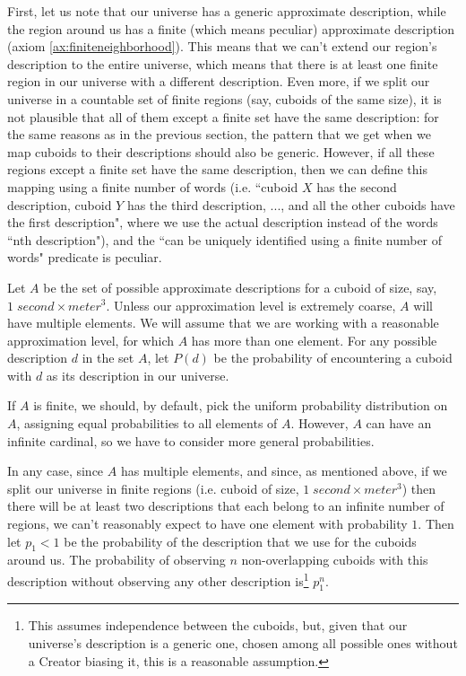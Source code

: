 \documentclass[a4paper
,draft
]{article}
\newcommand{\ghilimele}[1]{``#1"}
\begin{document}
First, let us note that our universe has a generic approximate description,
while the region around us has a finite (which means peculiar) approximate
description (axiom \ref{ax:finiteneighborhood}).
This means that we can't
extend our region's description to the entire universe, which means that
there is at least one finite region in our universe with a different
description.
Even more, if we split our universe in a countable set of finite regions
(say, cuboids of the same size),
it is not plausible that all of them except a finite set have the same
description: for the same reasons as in the previous section,
the pattern that we get when we map cuboids to their descriptions should also
be generic.
However, if all these regions except a finite set have the same
description, then we can define this mapping using a finite number of words
(i.e. \ghilimele{cuboid $X$ has the second description,
cuboid $Y$ has the third description, ..., and all the other cuboids have the
first description}, where we use the actual description instead of the words
\ghilimele{nth description}),
and the \ghilimele{can be uniquely identified using a
finite number of words} predicate is peculiar.

Let $A$ be the set of possible approximate descriptions for
a cuboid of size, say, $1\;second \times meter^3$.
Unless our approximation level is extremely coarse,
$A$ will have multiple elements.
We will assume that we are working with a reasonable approximation level,
for which $A$ has more than one element.
For any possible description $d$ in the set $A$,
let $P(d)$ be the probability of encountering
a cuboid with $d$ as its description in our universe.

If $A$ is finite, we should, by default, pick the uniform probability
distribution on $A$, assigning equal probabilities to all elements of $A$.
However, $A$ can have an infinite cardinal,
so we have to consider more general probabilities.

In any case, since $A$ has multiple elements, and since, as mentioned above,
if we split our universe in finite regions
(i.e. cuboid of size, $1\;second \times meter^3$) then there will be
at least two descriptions that each belong to an infinite number of regions,
we can't reasonably expect to have one element with probability $1$.
Then let $p_1<1$ be the probability of the description that we use for the
cuboids around us.
The probability of observing $n$
non-overlapping cuboids
with this description without observing any other description is\footnote{
  This assumes independence between the cuboids, but, given that our
  universe's description is a generic one, chosen among all possible
  ones without a Creator biasing it, this is a reasonable assumption.
}
$p_1^n$.
\end{document}
